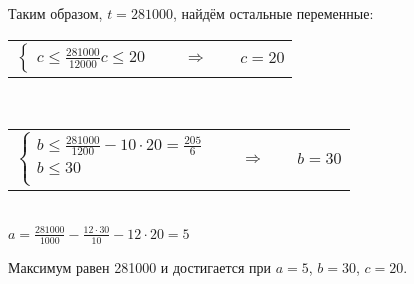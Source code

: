 \documentclass{article}
\begin{document}
	Таким образом, $t = 281000$, найдём остальные переменные: \\
	\begin{center}
		\begin{tabular}{ccc}
		$ \begin{cases}
		c \leq \frac{281000}{12000}
		c \leq 20
		\end{cases} $
		& $\quad \Rightarrow \quad$ &
		$c = 20$
		\end{tabular} \\
		\begin{tabular}{ccc}
			$ \begin{cases}
			b \leq \frac{281000}{1200} -10\cdot 20  = \frac{205}{6}\\
			b \leq 30 \\
			\end{cases} $
			& $\quad \Rightarrow \quad$ &
			$b = 30$
		\end{tabular}\\
		$a = \frac{281000}{1000} - \frac{12\cdot 30}{10} - 12\cdot 20 = 5$
	\end{center}
	Максимум равен 281000 и достигается при $a = 5$, $b = 30$, $c = 20$.
\end{document}

